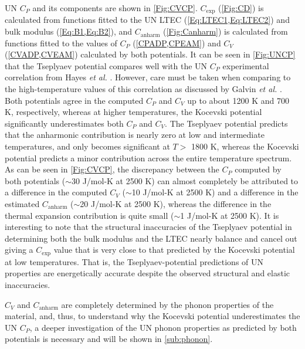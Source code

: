 \documentclass[preprint, 12pt]{elsarticle}
\begin{document}
UN $C_P$ and its components are shown in \cref{Fig:CVCP}. $C_{\mathrm{exp}}$ (\cref{Fig:CD}) is calculated from functions fitted to the UN LTEC (\cref{Eq:LTEC1,Eq:LTEC2}) and bulk modulus (\cref{Eq:B1,Eq:B2}), and $C_\mathrm{anharm}$ (\cref{Fig:Canharm}) is calculated from functions fitted to the values of $C_P$ (\cref{CPADP,CPEAM}) and $C_V$ (\cref{CVADP,CVEAM}) calculated by both potentials. It can be seen in \cref{Fig:UNCP} that the Tseplyaev potential compares well with the UN $C_P$ experimental correlation from Hayes \textit{et al.} \cite{Hayes1990IV}. However, care must be taken when comparing to the high-temperature values of this correlation as discussed by Galvin \textit{et al.} \cite{Galvin2023}. Both potentials agree in the computed $C_P$ and $C_V$ up to about 1200 K and 700 K, respectively, whereas at higher temperatures, the Kocevski potential significantly underestimates both $C_P$ and $C_V$. The Tseplyaev potential predicts that the anharmonic contribution is nearly zero at low and intermediate temperatures, and only becomes significant at $T >$ 1800 K, whereas the Kocevski potential predicts a minor contribution across the entire temperature spectrum. As can be seen in \cref{Fig:CVCP}, the discrepancy between the $C_P$ computed by both potentials ($\sim$30 J/mol-K at 2500 K) can almost completely be attributed to a difference in the computed $C_V$ ($\sim$10 J/mol-K at 2500 K) and a difference in the estimated $C_\mathrm{anharm}$ ($\sim$20 J/mol-K at 2500 K), whereas the difference in the thermal expansion contribution is quite small ($\sim$1 J/mol-K at 2500 K). It is interesting to note that the structural inaccuracies of the Tseplyaev potential in determining both the bulk modulus and the LTEC nearly balance and cancel out giving a $C_\mathrm{exp}$ value that is very close to that predicted by the Kocevski potential at low temperatures. That is, the Tseplyaev-potential predictions of UN properties are energetically accurate despite the observed structural and elastic inaccuracies.


$C_V$ and $C_\mathrm{anharm}$ are completely determined by the phonon properties of the material, and, thus, to understand why the Kocevski potential underestimates the UN $C_P$, a deeper investigation of the UN phonon properties as predicted by both potentials is necessary and will be shown in \cref{sub:phonon}.
\end{document}
